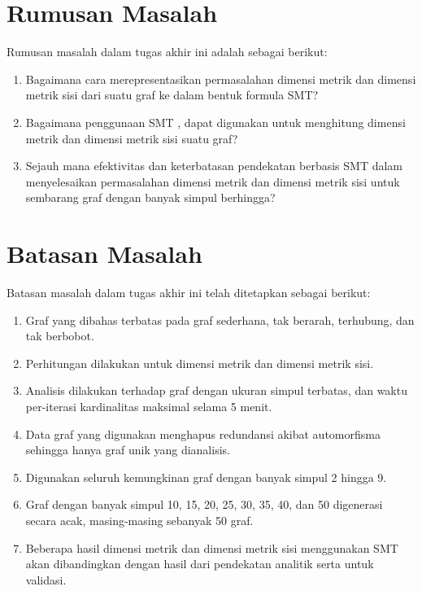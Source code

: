 \section{Rumusan Masalah}

\noindent Rumusan masalah dalam tugas akhir ini adalah sebagai berikut:
\begin{enumerate}
	\item Bagaimana cara merepresentasikan permasalahan dimensi metrik dan dimensi metrik sisi dari suatu graf ke dalam bentuk formula SMT?

	\item Bagaimana penggunaan SMT , dapat digunakan untuk menghitung dimensi metrik dan dimensi metrik sisi suatu graf?

	\item Sejauh mana efektivitas dan keterbatasan pendekatan berbasis SMT dalam menyelesaikan permasalahan dimensi metrik dan dimensi metrik sisi untuk sembarang graf dengan banyak simpul berhingga?
\end{enumerate}

\section{Batasan Masalah}

\noindent Batasan masalah dalam tugas akhir ini telah ditetapkan sebagai berikut:
\begin{enumerate}
	\item Graf yang dibahas terbatas pada graf sederhana, tak berarah, terhubung, dan tak berbobot.

	\item Perhitungan dilakukan untuk dimensi metrik dan dimensi metrik sisi.

	\item Analisis dilakukan terhadap graf dengan ukuran simpul terbatas, dan waktu per-iterasi kardinalitas maksimal selama 5 menit.

	\item Data graf yang digunakan menghapus redundansi akibat automorfisma sehingga hanya graf unik yang dianalisis.

	\item Digunakan seluruh kemungkinan graf dengan banyak simpul 2 hingga 9.

	\item Graf dengan banyak simpul 10, 15, 20, 25, 30, 35, 40, dan 50 digenerasi secara acak, masing-masing sebanyak 50 graf.

	\item Beberapa hasil dimensi metrik dan dimensi metrik sisi menggunakan SMT akan dibandingkan dengan hasil dari pendekatan analitik serta  untuk validasi.
\end{enumerate}

